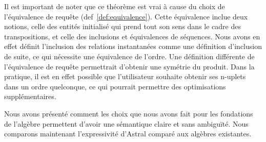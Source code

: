 Il est important de noter que ce théorème est vrai à cause du choix de l'équivalence de requête (def~\ref{def:equivalence}). Cette équivalence inclue deux notions, celle des entités initialisé qui prend tout son sens dans le cadre des transpositions, et celle des inclusions et équivalences de séquences. Nous avons en effet définit l'inclusion des relations instantanées comme une définition d'inclusion de suite, ce qui nécessite une équivalence de l'ordre. Une définition différente de l'équivalence de requête permettrait d'obtenir une symétrie du produit. Dans la pratique, il est en effet possible que l'utilisateur souhaite obtenir ses n-uplets dans un ordre quelconque, ce qui pourrait permettre des optimisations supplémentaires.

Nous avons présenté comment les choix que nous avons fait pour les fondations de l'algèbre permettent d'avoir une sémantique claire et sans ambiguïté. Nous comparons maintenant l'expressivité d'Astral comparé aux algèbres existantes.